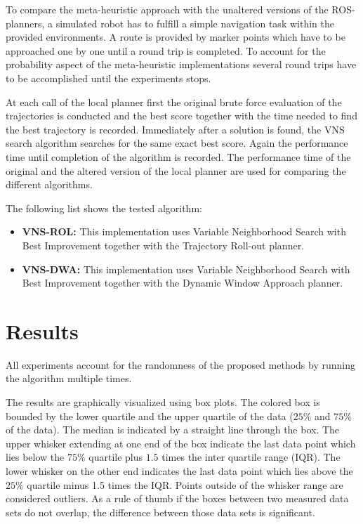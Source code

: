 To compare the meta-heuristic approach with the unaltered versions of the ROS-planners, a simulated robot has to fulfill a simple navigation task within the provided environments.
A route is provided by marker points which have to be approached one by one until a round trip is completed.
To account for the probability aspect of the meta-heuristic implementations several round trips have to be accomplished until the experiments stops.

At each call of the local planner first the original brute force evaluation of the trajectories is conducted and the best score together with the time needed to find the best trajectory is recorded.
Immediately after a solution is found, the VNS search algorithm searches for the same exact best score.
Again the performance time until completion of the algorithm is recorded.
The performance time of the original and the altered version of the local planner are used for  comparing the different algorithms. 

The following list shows the tested algorithm:
\begin{itemize}
\item{\bf{VNS-ROL:}} This implementation uses Variable Neighborhood Search with Best Improvement together with the Trajectory Roll-out planner.
\item{\bf{VNS-DWA:}} This implementation uses Variable Neighborhood Search with Best Improvement together with the Dynamic Window Approach planner. 
\end{itemize}

\section{Results}\label{sec:testresults}

All experiments account for the randomness of the proposed methods by running the algorithm multiple times.

The results are graphically visualized using box plots. 
The colored box is bounded by the lower quartile and the upper quartile of the data ($25\%$ and $75\%$ of the data). 
The median is indicated by a straight line through the box. 
The upper whisker extending at one end of the box indicate the last data point which lies below the $75\%$ quartile plus $1.5$ times the
inter quartile range (IQR). The lower whisker on the other end indicates the last data point which lies above the $25\%$ quartile minus 1.5 times the IQR. 
Points outside of the whisker range are considered outliers.
As a rule of thumb if the boxes between two measured data sets do not overlap, the difference between those data sets is significant.

